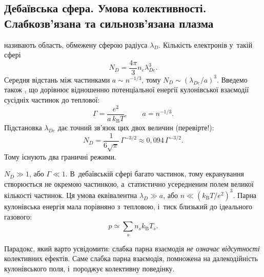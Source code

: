 \subsection*{Дебаївська сфера. Умова колективності. Слабкозв'язана та сильнозв'язана плазма}



 називають область, обмежену сферою радіуса $\lambda_D$.
Кількість електронів у~такій сфері
\begin{equation}\label{eq:debye-number}
	N_D=\frac{4\pi}3n_e\lambda_{De}^3.
\end{equation}
Середня відстань між частинками $a\sim n^{-1/3}$, тому $N_D\sim(\lambda_{De}/a)^3$.
Введемо також , що дорівнює відношенню потенціальної енергії
кулонівської взаємодії сусідніх частинок до теплової:
\begin{equation}\label{eq:coupling}
	\Gamma=\frac{e^2}{a\,k_{\mathrm B}T},\qquad a=n^{-1/3}.
\end{equation}
Підстановка $\lambda_{De}$ дає точний зв'язок цих двох величин (перевірте!):
\begin{equation}\label{eq:ND-Gamma}
	N_D=\frac1{6\sqrt\pi}\,\Gamma^{-3/2}\approx0{,}094\,\Gamma^{-3/2}.
\end{equation}
Тому існують два граничні режими.

 $N_D\gg1$, або $\Gamma\ll1$.
В~дебаївській сфері багато частинок, тому екранування створюється не окремою частинкою,
а~статистично усередненим полем великої кількості частинок. Ця умова еквівалентна
$\lambda_D\gg a$, або $n\ll(k_{\mathrm B}T/e^2)^3$. Парна кулонівська енергія мала
порівняно з~тепловою, і~тиск близький до ідеального газового:
\begin{equation}\label{eq:ideal-pressure}
	p\simeq\sum_sn_sk_{\mathrm B}T_s.
\end{equation}
\begin{Attention}
	Парадокс, який варто усвідомити: слабка парна взаємодія \emph{не означає відсутності}
	колективних ефектів. Саме слабка парна взаємодія, помножена на далекодійність
	кулонівського поля, і~породжує колективну поведінку.
\end{Attention}

